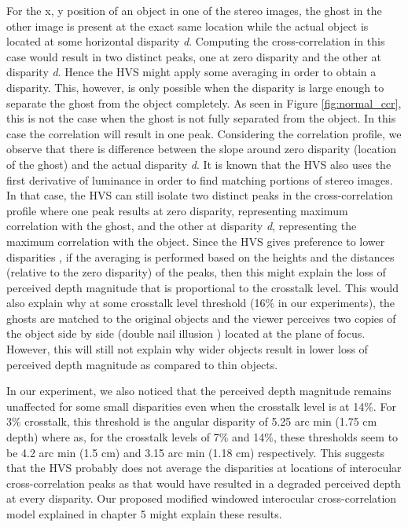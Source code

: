 For the x, y position of an object in one of the stereo images, the ghost in the other image is present at the exact same location while the actual object is located at some horizontal disparity \emph{d}. Computing the cross-correlation in this case would result in two distinct peaks, one at zero disparity and the other at disparity \emph{d}. Hence the HVS might apply some averaging in order to obtain a disparity. This, however, is only possible when the disparity is large enough to separate the ghost from the object completely. As seen in Figure \ref{fig:normal_ccr}, this is not the case when the ghost is not fully separated from the object. In this case the correlation will result in one peak. Considering the correlation profile, we observe that there is difference between the slope around zero disparity (location of the ghost) and the actual disparity \emph{d}. It is known \cite{howard1995binocular} that the HVS also uses the first derivative of luminance in order to find matching portions of stereo images. In that case, the HVS can still isolate two distinct peaks in the cross-correlation profile where one peak results at zero disparity, representing maximum correlation with the ghost, and the other at disparity \emph{d}, representing the maximum correlation with the object. Since the HVS gives preference to lower disparities \cite{krol1980double}, if the averaging is performed based on the heights and the distances (relative to the zero disparity) of the peaks, then this might explain the loss of perceived depth magnitude that is proportional to the crosstalk level. This would also explain why at some crosstalk level threshold (16\% in our experiments), the ghosts are matched to the original objects and the viewer perceives two copies of the object side by side (double nail illusion \cite{tsirlin2012effect}) located at the plane of focus. However, this will still not explain why wider objects result in lower loss of perceived depth magnitude as compared to thin objects.

In our experiment, we also noticed that the perceived depth magnitude remains unaffected for some small disparities even when the crosstalk level is at 14\%. For 3\% crosstalk, this threshold is the angular disparity of 5.25 arc min (1.75 cm depth) where as, for the crosstalk levels of 7\% and 14\%, these thresholds seem to be 4.2 arc min (1.5 cm) and 3.15 arc min (1.18 cm) respectively. This suggests that the HVS probably does not average the disparities at locations of interocular cross-correlation peaks as that would have resulted in a degraded perceived depth at every disparity. Our proposed modified windowed interocular cross-correlation model explained in chapter 5 might explain these results.

